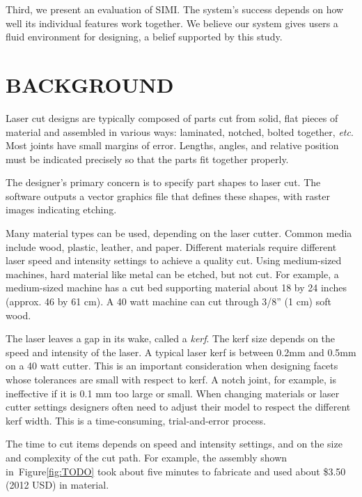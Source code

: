 \documentclass{article}
\begin{document}
Third, we present an evaluation of SIMI. The system's success depends
on how well its individual features work together. We believe our
system gives users a fluid environment for designing, a belief
supported by this study.

\section{BACKGROUND}

Laser cut designs are typically composed of parts cut from solid, flat
pieces of material and assembled in various ways: laminated, notched,
bolted together, \textit{etc}. Most joints have small margins of
error. Lengths, angles, and relative position must be indicated
precisely so that the parts fit together properly.

The designer's primary concern is to specify part shapes to laser
cut. The software outputs a vector graphics file that defines these
shapes, with raster images indicating etching.

Many material types can be used, depending on the laser cutter. Common
media include wood, plastic, leather, and paper. Different materials
require different laser speed and intensity settings to achieve a
quality cut. Using medium-sized machines, hard material like metal can
be etched, but not cut. For example, a medium-sized machine has a cut
bed supporting material about 18 by 24 inches (approx. 46 by 61 cm). A
40 watt machine can cut through 3/8'' (1 cm) soft wood.

The laser leaves a gap in its wake, called a \textit{kerf}. The kerf
size depends on the speed and intensity of the laser. A typical laser
kerf is between 0.2mm and 0.5mm on a 40 watt cutter. This is an
important consideration when designing facets whose tolerances are
small with respect to kerf. A notch joint, for example, is ineffective
if it is 0.1 mm too large or small. When changing materials or laser
cutter settings designers often need to adjust their model to respect
the different kerf width. This is a time-consuming, trial-and-error
process.

The time to cut items depends on speed and intensity settings, and on
the size and complexity of the cut path. For example, the assembly
shown in~Figure\ref{fig:TODO} took about five minutes to fabricate and
used about \$3.50 (2012 USD) in material. 

\end{document}
